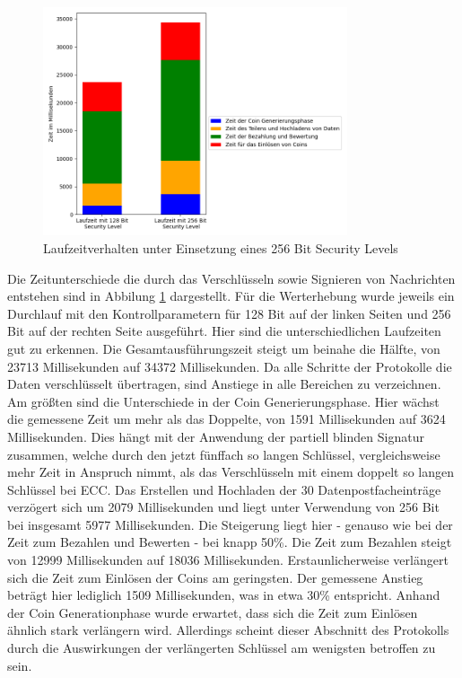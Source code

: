 \documentclass{scrreprt}
\begin{document}
\begin{figure}[h]
    \caption{Laufzeitverhalten unter Einsetzung eines 256 Bit Security Levels}
    \label{fig:win_256bit}
    \centering
    \includegraphics[width=0.8\textwidth]{figure_win_256Bit.png}
\end{figure}
Die Zeitunterschiede die durch das Verschlüsseln sowie Signieren von Nachrichten entstehen sind in Abbilung \ref{fig:win_256bit} dargestellt. Für die Werterhebung wurde jeweils ein Durchlauf mit den Kontrollparametern für 128 Bit auf der linken Seiten und 256 Bit auf der rechten Seite ausgeführt. Hier sind die unterschiedlichen Laufzeiten gut zu erkennen. Die Gesamtausführungszeit steigt um beinahe die Hälfte, von 23713 Millisekunden auf 34372 Millisekunden. Da alle Schritte der Protokolle die Daten verschlüsselt übertragen, sind Anstiege in alle Bereichen zu verzeichnen. Am größten sind die Unterschiede in der Coin Generierungsphase. Hier wächst die gemessene Zeit um mehr als das Doppelte, von 1591 Millisekunden auf 3624 Millisekunden. Dies hängt mit der Anwendung der partiell blinden Signatur zusammen, welche durch den jetzt fünffach so langen Schlüssel, vergleichsweise mehr Zeit in Anspruch nimmt, als das Verschlüsseln mit einem doppelt so langen Schlüssel bei ECC. Das Erstellen und Hochladen der 30 Datenpostfacheinträge verzögert sich um 2079 Millisekunden und liegt unter Verwendung von 256 Bit bei insgesamt 5977 Millisekunden. Die Steigerung liegt hier - genauso wie bei der Zeit zum Bezahlen und Bewerten - bei knapp 50\%. Die Zeit zum Bezahlen steigt von 12999 Millisekunden auf 18036 Millisekunden. Erstaunlicherweise verlängert sich die Zeit zum Einlösen der Coins am geringsten. Der gemessene Anstieg beträgt hier lediglich 1509 Millisekunden, was in etwa 30\% entspricht. Anhand der Coin Generationphase wurde erwartet, dass sich die Zeit zum Einlösen ähnlich stark verlängern wird. Allerdings scheint dieser Abschnitt des Protokolls durch die Auswirkungen der verlängerten Schlüssel am wenigsten betroffen zu sein.
\end{document}
